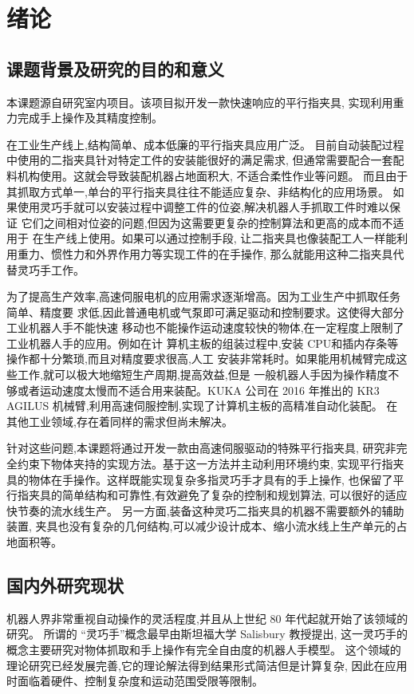 \chapter{绪论}

\section{课题背景及研究的目的和意义}
本课题源自研究室内项目。该项目拟开发一款快速响应的平行指夹具,
实现利用重力完成手上操作及其精度控制。

在工业生产线上,结构简单、成本低廉的平行指夹具应用广泛。
目前自动装配过程中使用的二指夹具针对特定工件的安装能很好的满足需求,
但通常需要配合一套配料机构使用。这就会导致装配机器占地面积大,
不适合柔性作业等问题。
而且由于其抓取方式单一,单台的平行指夹具往往不能适应复杂、非结构化的应用场景。
如果使用灵巧手就可以安装过程中调整工件的位姿,解决机器人手抓取工件时难以保证
它们之间相对位姿的问题,但因为这需要更复杂的控制算法和更高的成本而不适用于
在生产线上使用。如果可以通过控制手段,
让二指夹具也像装配工人一样能利用重力、惯性力和外界作用力等实现工件的在手操作,
那么就能用这种二指夹具代替灵巧手工作。

为了提高生产效率,高速伺服电机的应用需求逐渐增高。因为工业生产中抓取任务简单、精度要
求低,因此普通电机或气泵即可满足驱动和控制要求。这使得大部分工业机器人手不能快速
移动也不能操作运动速度较快的物体,在一定程度上限制了工业机器人手的应用。例如在计
算机主板的组装过程中,安装 CPU和插内存条等操作都十分繁琐,而且对精度要求很高,人工
安装非常耗时。如果能用机械臂完成这些工作,就可以极大地缩短生产周期,提高效益,但是
一般机器人手因为操作精度不够或者运动速度太慢而不适合用来装配。KUKA 公司在 2016
年推出的 KR3 AGILUS 机械臂,利用高速伺服控制,实现了计算机主板的高精准自动化装配。
在其他工业领域,存在着同样的需求但尚未解决。

针对这些问题,本课题将通过开发一款由高速伺服驱动的特殊平行指夹具,
研究非完全约束下物体夹持的实现方法。基于这一方法并主动利用环境约束,
实现平行指夹具的物体在手操作。这样既能实现复杂多指灵巧手才具有的手上操作,
也保留了平行指夹具的简单结构和可靠性,有效避免了复杂的控制和规划算法,
可以很好的适应快节奏的流水线生产。
另一方面,装备这种灵巧二指夹具的机器不需要额外的辅助装置,
夹具也没有复杂的几何结构,可以减少设计成本、缩小流水线上生产单元的占地面积等。

\section{国内外研究现状}
机器人界非常重视自动操作的灵活程度,并且从上世纪 80 年代起就开始了该领域的研究。
所谓的 “灵巧手”概念最早由斯坦福大学 Salisbury 教授提出,
这一灵巧手的概念主要研究对物体抓取和手上操作有完全自由度的机器人手模型。
这个领域的理论研究已经发展完善,它的理论解法得到结果形式简洁但是计算复杂,
因此在应用时面临着硬件、控制复杂度和运动范围受限等限制\cite{ref1}。

